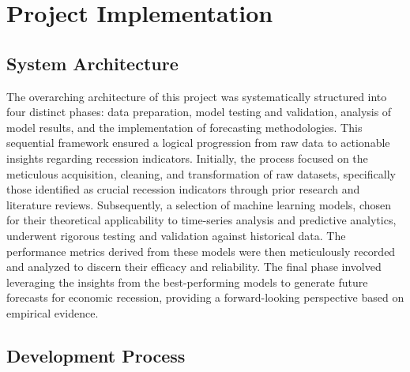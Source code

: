 
\section{Project Implementation}

\begin{comment}
\begin{itemize}
    \item \hlgreen{System Architecture: For technical projects, outline the architecture or structure of your system.}
    \item \hlgreen{Development Process: Discuss the steps you took to build, test, and deploy your solution.}
    \item \hlgreen{Technologies Used: Mention programming languages, frameworks, or tools employed.}
\end{itemize}
\end{comment}






\subsection{System Architecture}

The overarching architecture of this project was systematically structured into four distinct phases: data preparation, model testing and validation, analysis of model results, and the implementation of forecasting methodologies. This sequential framework ensured a logical progression from raw data to actionable insights regarding recession indicators. 
Initially, the process focused on the meticulous acquisition, cleaning, and transformation of raw datasets, specifically those identified as crucial recession indicators through prior research and literature reviews. Subsequently, a selection of machine learning models, chosen for their theoretical applicability to time-series analysis and predictive analytics, underwent rigorous testing and validation against historical data. The performance metrics derived from these models were then meticulously recorded and analyzed to discern their efficacy and reliability. The final phase involved leveraging the insights from the best-performing models to generate future forecasts for economic recession, providing a forward-looking perspective based on empirical evidence.


\subsection{Development Process}

